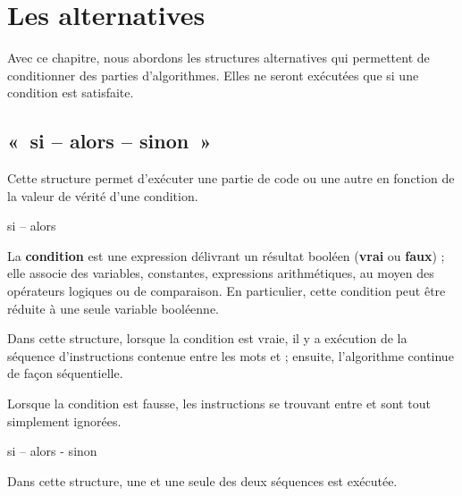 \chapter{Les alternatives}

Avec ce chapitre, nous abordons les structures alternatives qui
permettent de conditionner des parties d'algorithmes.
Elles ne seront exécutées que si une condition est satisfaite.

\section{«~si – alors – sinon~»}

Cette structure permet d'exécuter une partie de code ou
une autre en fonction de la valeur de vérité d'une
condition.

\begin{Emphase}[definition]{si – alors}
\end{Emphase}

La \textbf{condition} est une expression délivrant un résultat booléen
(\textbf{vrai} ou \textbf{faux}) ; elle associe des variables,
constantes, expressions arithmétiques, au moyen des opérateurs logiques
ou de comparaison. En particulier, cette condition peut être réduite à
une seule variable booléenne.

Dans cette structure, lorsque la condition est vraie, il y a exécution
de la séquence d’instructions contenue entre les mots
 et  ; ensuite,
l’algorithme continue de façon séquentielle.

Lorsque la condition est fausse, les instructions se trouvant entre
 et  sont tout simplement
ignorées.


\begin{Emphase}[definition]{si – alors - sinon}
\end{Emphase}

Dans cette structure, une et une seule des deux séquences est exécutée.


